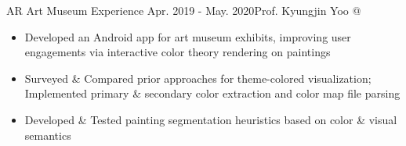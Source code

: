{    \cveventSameLine{}%
        {AR Art Museum Experience}%
        {Apr. 2019 - May. 2020}{Prof. Kyungjin Yoo @ }%
    \begin{itemize}%
        \item Developed an  Android app
        for art museum exhibits, improving user engagements via interactive color theory rendering on paintings%
        \item Surveyed \& Compared prior approaches for theme-colored visualization; Implemented primary \& secondary color extraction and color map file parsing%
        \item Developed \& Tested painting segmentation heuristics based on color \& visual semantics%
    \end{itemize}%
    \dividerSmall
}%
%
%